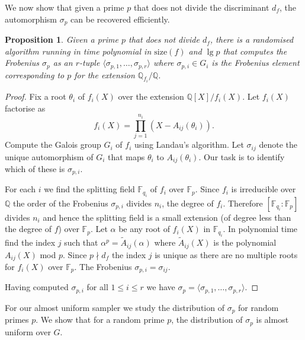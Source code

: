 \documentclass[11pt]{madras}%
\newtheorem{proposition}[theorem]{Proposition}
\theoremstyle{remark}
\newcommand{\size}[1]{{\ensuremath{\mathrm{size}\left(#1\right)}}}
\begin{document}
We now show that given a prime $p$ that does not divide the
discriminant $d_f$, the automorphism $\sigma_p$ can be recovered
efficiently.


\begin{proposition}\label{prop-recover-frob}%
  Given a prime $p$ that does not divide $d_f$, there is a randomised
  algorithm running in time polynomial in $\size{f}$ and $\lg{p}$ that
  computes the Frobenius $\sigma_p$ as an $r$-tuple $\langle
  \sigma_{p,1},\ldots,\sigma_{p,r} \rangle$ where $\sigma_{p,i} \in
  G_i$ is the Frobenius element corresponding to $p$ for the extension
  $\mathbb{Q}_{f_i}/\mathbb{Q}$.
\end{proposition}
\begin{proof}

  Fix a root $\theta_i$ of $f_i(X)$ over the extension
  $\mathbb{Q}[X]/f_i(X)$. Let $f_i(X)$ factorise as
  \[
  f_i(X) = \prod_{j=1}^{n_i} (X - A_{ij}(\theta_i)).
  \]
  Compute the Galois group $G_i$ of $f_i$ using Landau's algorithm.
  Let $\sigma_{ij}$ denote the unique automorphism of $G_i$ that maps
  $\theta_i$ to $A_{ij}(\theta_i)$. Our task is to identify which of
  these is $\sigma_{p,i}$.

  For each $i$ we find the splitting field $\mathbb{F}_{q_i}$ of $f_i$
  over $\mathbb{F}_p$.  Since $f_i$ is irreducible over $\mathbb{Q}$
  the order of the Frobenius $\sigma_{p,i}$ divides $n_i$, the degree
  of $f_i$.  Therefore $[\mathbb{F}_{q_i}: \mathbb{F}_p]$ divides
  $n_i$ and hence the splitting field is a small extension (of degree
  less than the degree of $f$) over $\mathbb{F}_p$. Let $\alpha$ be
  any root of $f_i(X)$ in $\mathbb{F}_{q_i}$. In polynomial time find
  the index $j$ such that $\alpha^p = \tilde{A}_{ij}(\alpha)$ where
  $\tilde{A}_{ij}(X)$ is the polynomial $A_{ij}(X)$ mod $p$.  Since $p
  \nmid d_f$ the index $j$ is unique as there are no multiple roots
  for $f_i(X)$ over $\mathbb{F}_p$. The Frobenius $\sigma_{p,i} =
  \sigma_{ij}$.
  
  Having computed $\sigma_{p,i}$ for all $1 \leq i \leq r$ we have
  $\sigma_p = \langle \sigma_{p,1}, \ldots, \sigma_{p,r} \rangle$.
\end{proof}


For our almost uniform sampler we study the distribution of $\sigma_p$
for random primes $p$. We show that for a random prime $p$, the
distribution of $\sigma_p$ is almost uniform over $G$.
\end{document}
